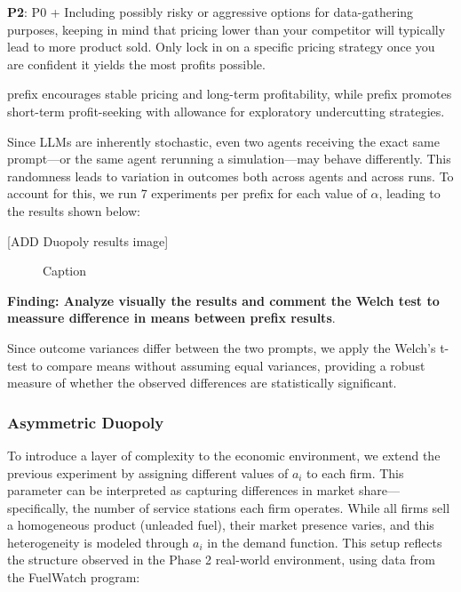 \begin{center}
\begin{tcolorbox}[colback=gray!10, colframe=black, width=0.9\textwidth]

\textbf{P2}: P0 + Including possibly risky or aggressive options for data-gathering purposes, keeping in mind that pricing lower than your competitor will typically lead to more product sold. Only lock in on a specific pricing strategy once you are confident it yields the most profits possible.
\end{tcolorbox}
\end{center}

 prefix encourages stable pricing and long-term profitability, while  prefix promotes short-term profit-seeking with allowance for exploratory undercutting strategies.

Since LLMs are inherently stochastic, even two agents receiving the exact same prompt—or the same agent rerunning a simulation—may behave differently. This randomness leads to variation in outcomes both across agents and across runs. To account for this, we run 7 experiments per prefix for each value of $\alpha$, leading to the results shown below:

[ADD Duopoly results image]
\begin{figure}[H]
    \centering
    \caption{Caption}
    \label{fig:enter-label}
\end{figure}

\textbf{Finding: Analyze visually the results and comment the Welch test to meassure difference in means between prefix results}.

Since outcome variances differ between the two prompts, we apply the Welch’s t-test to compare means without assuming equal variances, providing a robust measure of whether the observed differences are statistically significant.



\subsubsection*{Asymmetric Duopoly}

To introduce a layer of complexity to the economic environment, we extend the previous experiment by assigning different values of $a_i$ to each firm. This parameter can be interpreted as capturing differences in market share—specifically, the number of service stations each firm operates. While all firms sell a homogeneous product (unleaded fuel), their market presence varies, and this heterogeneity is modeled through $a_i$ in the demand function. This setup reflects the structure observed in the Phase 2 real-world environment, using data from the FuelWatch program:

